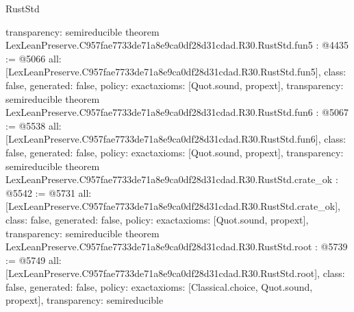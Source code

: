 \begin{lexlean}{RustStd}
\begin{coremodule}
{  transparency: semireducible
}
theorem LexLeanPreserve.C957fae7733de71a8e9ca0df28d31cdad.R30.RustStd.fun5 : @4435 := @5066 {
  all: [LexLeanPreserve.C957fae7733de71a8e9ca0df28d31cdad.R30.RustStd.fun5],
  class: false,
  generated: false,
  policy: exact{axioms: [Quot.sound, propext]},
  transparency: semireducible
}
theorem LexLeanPreserve.C957fae7733de71a8e9ca0df28d31cdad.R30.RustStd.fun6 : @5067 := @5538 {
  all: [LexLeanPreserve.C957fae7733de71a8e9ca0df28d31cdad.R30.RustStd.fun6],
  class: false,
  generated: false,
  policy: exact{axioms: [Quot.sound, propext]},
  transparency: semireducible
}
theorem LexLeanPreserve.C957fae7733de71a8e9ca0df28d31cdad.R30.RustStd.crate_ok : @5542 := @5731 {
  all: [LexLeanPreserve.C957fae7733de71a8e9ca0df28d31cdad.R30.RustStd.crate_ok],
  class: false,
  generated: false,
  policy: exact{axioms: [Quot.sound, propext]},
  transparency: semireducible
}
theorem LexLeanPreserve.C957fae7733de71a8e9ca0df28d31cdad.R30.RustStd.root : @5739 := @5749 {
  all: [LexLeanPreserve.C957fae7733de71a8e9ca0df28d31cdad.R30.RustStd.root],
  class: false,
  generated: false,
  policy: exact{axioms: [Classical.choice, Quot.sound, propext]},
  transparency: semireducible
}


\end{coremodule}
\end{lexlean}
